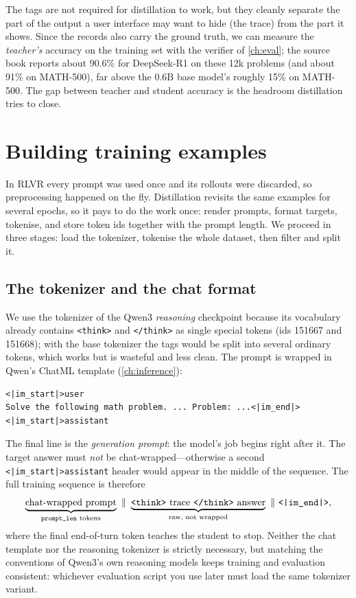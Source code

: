 The tags are not required for distillation to work, but they cleanly separate the part of the
output a user interface may want to hide (the trace) from the part it shows. Since the records
also carry the ground truth, we can measure the \emph{teacher's} accuracy on the training set
with the verifier of \cref{ch:eval}; the source book reports about 90.6\% for DeepSeek-R1 on
these 12k problems (and about 91\% on MATH-500), far above the 0.6B base model's roughly 15\%
on MATH-500. The gap between teacher and student accuracy is the headroom distillation tries
to close.
\section{Building training examples}\label{sec:distill:examples}

In RLVR every prompt was used once and its rollouts were discarded, so preprocessing happened
on the fly. Distillation revisits the same examples for several epochs, so it pays to do the
work once: render prompts, format targets, tokenise, and store token ids together with the
prompt length. We proceed in three stages: load the tokenizer, tokenise the whole dataset,
then filter and split it.

\subsection{The tokenizer and the chat format}\label{sec:distill:tok}

We use the tokenizer of the Qwen3 \emph{reasoning} checkpoint because its vocabulary already
contains \texttt{<think>} and \texttt{</think>} as single special tokens (ids 151667 and
151668); with the base tokenizer the tags would be split into several ordinary tokens, which
works but is wasteful and less clean. The prompt is wrapped in Qwen's ChatML template
(\cref{ch:inference}):
\begin{lstlisting}[style=plain]
<|im_start|>user
Solve the following math problem. ... Problem: ...<|im_end|>
<|im_start|>assistant
\end{lstlisting}
The final line is the \emph{generation prompt}: the model's job begins right after it.
The target answer must \emph{not} be chat-wrapped---otherwise a second
\texttt{<|im\_start|>assistant} header would appear in the middle of the sequence. The full
training sequence is therefore
\[
\underbrace{\text{chat-wrapped prompt}}_{\text{\texttt{prompt\_len} tokens}}\ \Vert\
\underbrace{\texttt{<think>}\ \text{trace}\ \texttt{</think>}\ \text{answer}}_{\text{raw, not wrapped}}\ \Vert\
\texttt{<|im\_end|>},
\]
where the final end-of-turn token teaches the student to stop. Neither the chat template nor
the reasoning tokenizer is strictly necessary, but matching the conventions of Qwen3's own
reasoning models keeps training and evaluation consistent: whichever evaluation script you use
later must load the same tokenizer variant.

